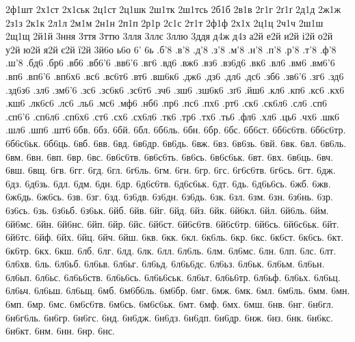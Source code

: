 {2ф1шт 2х1ст 2х1ськ 2ц1ст 2ц1шк 2ш1тк 2ш1тсь 
2б1б 2в1в 2г1г 2ґ1ґ 2д1д 2ж1ж 2з1з 2к1к 
2л1л 2м1м 2н1н 2п1п 2р1р 2с1с 2т1т 2ф1ф 
2х1х 2ц1ц 2ч1ч 2ш1ш 2щ1щ 2й1й 
3ння 3ття 3ттю 3лля 3ллє 3ллю 3ддя 
д4ж д4з 
а2й е2й и2й і2й о2й у2й ю2й я2й є2й ї2й 3й6о 
ь6о 6' 6ь 
.б'8 .в'8 .д'8 .з'8 .м'8 .н'8 .п'8 .р'8 
.т'8 .ф'8 .ш'8 .бд6 .бр6 .вб6 .вб6'6 .вв6'6 
.вг6 .вд6 .вж6 .вз6 .вз6д6 .вк6 .вл6 .вм6 
.вм6'6 .вп6 .вп6'6 .вп6х6 .вс6 .вс6т6 .вт6 .вш6к6 
.дж6 .дз6 .дл6 .дс6 .зб6 .зв6'6 .зг6 .зд6 
.зд6з6 .зл6 .зм6'6 .зс6 .зс6к6 .зс6т6 .зч6 .зш6 
.зш6к6 .зґ6 .йш6 .кл6 .кп6 .кс6 .кх6 .кш6 
.лк6с6 .лс6 .ль6 .мс6 .мф6 .нб6 .пр6 .пс6 
.пх6 .рт6 .ск6 .ск6л6 .сл6 .сп6 .сп6'6 .сп6л6 
.сп6х6 .ст6 .сх6 .сх6л6 .тк6 .тр6 .тх6 .ть6 
.фл6 .хл6 .ць6 .чх6 .шк6 .шл6 .шп6 .шт6 
6бв. 6бз. 6бй. 6бл. 6б6ль. 6бн. 6бр. 6бс. 
6б6ст. 6б6с6тв. 6б6с6тр. 6б6с6ьк. 6б6ць. 6вб. 6вв. 6вд. 
6в6др. 6в6дь. 6вж. 6вз. 6в6зь. 6вй. 6вк. 6вл. 
6в6ль. 6вм. 6вн. 6вп. 6вр. 6вс. 6в6с6тв. 6в6с6ть. 
6в6сь. 6в6с6ьк. 6вт. 6вх. 6в6ць. 6вч. 6вш. 6вщ. 
6гв. 6гг. 6гд. 6гл. 6г6ль. 6гм. 6гн. 6гр. 
6гс. 6г6с6тв. 6г6сь. 6гт. 6дж. 6дз. 6д6зь. 6дл. 
6дм. 6дн. 6др. 6д6с6тв. 6д6с6ьк. 6дт. 6дь. 6д6ь6сь. 
6жб. 6жв. 6ж6дь. 6ж6сь. 6зв. 6зг. 6зд. 6з6дв. 
6з6дн. 6з6дь. 6зк. 6зл. 6зм. 6зн. 6з6нь. 6зр. 
6з6сь. 6зь. 6з6ьб. 6з6ьк. 6йб. 6йв. 6йг. 6йд. 
6йз. 6йк. 6й6кл. 6йл. 6й6ль. 6йм. 6й6мс. 6йн. 
6й6нс. 6йп. 6йр. 6йс. 6й6ст. 6й6с6тв. 6й6с6тр. 6й6сь. 
6й6с6ьк. 6йт. 6й6тс. 6йф. 6йх. 6йц. 6йч. 6йш. 
6кв. 6кк. 6кл. 6к6ль. 6кр. 6кс. 6к6ст. 6к6сь. 
6кт. 6к6тр. 6кх. 6кш. 6лб. 6лг. 6лд. 6лк. 
6лл. 6л6ль. 6лм. 6л6мс. 6лн. 6лп. 6лс. 6лт. 
6л6хв. 6ль. 6л6ьб. 6л6ьв. 6л6ьг. 6л6ьд. 6л6ь6дс. 6л6ьз. 
6л6ьк. 6л6ьм. 6л6ьн. 6л6ьп. 6л6ьс. 6л6ь6ств. 6л6ь6сь. 6л6ь6ськ. 
6л6ьт. 6л6ь6тр. 6л6ьф. 6л6ьх. 6л6ьц. 6л6ьч. 6л6ьш. 6л6ьщ. 
6мб. 6м6б6ль. 6м6бр. 6мг. 6мж. 6мк. 6мл. 6м6ль. 
6мм. 6мн. 6мп. 6мр. 6мс. 6м6с6тв. 6м6сь. 6м6с6ьк. 
6мт. 6мф. 6мх. 6мш. 6нв. 6нг. 6н6гл. 6н6г6ль. 
6н6гр. 6н6гс. 6нд. 6н6дж. 6н6дз. 6н6дп. 6н6др. 6нж. 
6нз. 6нк. 6н6кс. 6н6кт. 6нм. 6нн. 6нр. 6нс. 
}
